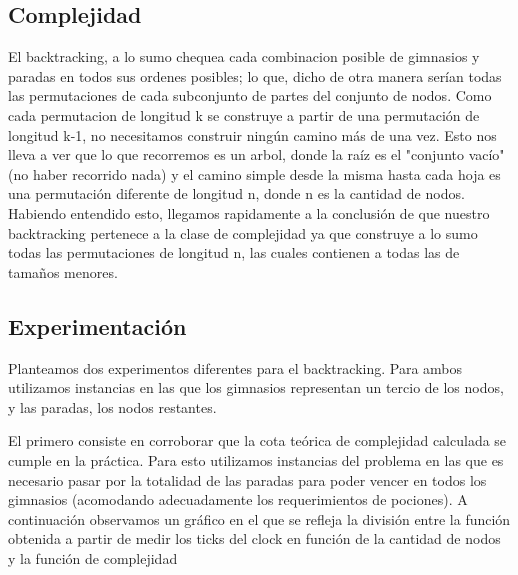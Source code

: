 \subsection{Complejidad}

El backtracking, a lo sumo chequea cada combinacion posible de gimnasios y paradas en todos sus ordenes posibles; lo que, dicho de otra manera serían todas las permutaciones de cada subconjunto de partes del conjunto de nodos. 
Como cada permutacion de longitud k se construye a partir de una permutación de longitud k-1, no necesitamos construir ningún camino más de una vez.
Esto nos lleva a ver que lo que recorremos es un arbol, donde la raíz es el "conjunto vacío" (no haber recorrido nada) y el camino simple desde la misma hasta cada hoja es una permutación diferente de longitud n, donde n es la cantidad de nodos.
Habiendo entendido esto, llegamos rapidamente a la conclusión de que nuestro backtracking pertenece a la clase de complejidad  ya que construye a lo sumo todas las permutaciones de longitud n, las cuales contienen a todas las de tamaños menores.


\subsection{Experimentaci\'on}

Planteamos dos experimentos diferentes para el backtracking. Para ambos utilizamos instancias en las que los gimnasios representan un tercio de los nodos, y las paradas, los nodos restantes.

El primero consiste en corroborar que la cota teórica de complejidad calculada se cumple en la práctica. Para esto utilizamos instancias del problema en las que es necesario pasar por la totalidad de las paradas para poder vencer en todos los gimnasios (acomodando adecuadamente los requerimientos de pociones). 
A continuación observamos un gráfico en el que se refleja la división entre la función obtenida a partir de medir los ticks del clock en función de la cantidad de nodos y la función de complejidad

